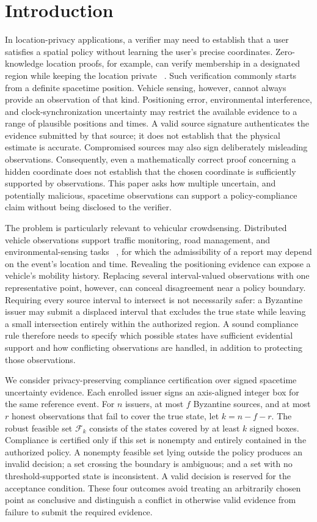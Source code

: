 \section{Introduction}
In location-privacy applications, a verifier may need to establish that a user satisfies a spatial policy without learning the user's precise coordinates. Zero-knowledge location proofs, for example, can verify membership in a designated region while keeping the location private ~\citep{ZKLP,VehiclePolicy}. Such verification commonly starts from a definite spacetime position. Vehicle sensing, however, cannot always provide an observation of that kind. Positioning error, environmental interference, and clock-synchronization uncertainty may restrict the available evidence to a range of plausible positions and times. A valid source signature authenticates the evidence submitted by that source; it does not establish that the physical estimate is accurate. Compromised sources may also sign deliberately misleading observations. Consequently, even a mathematically correct proof concerning a hidden coordinate does not establish that the chosen coordinate is sufficiently supported by observations. This paper asks how multiple uncertain, and potentially malicious, spacetime observations can support a policy-compliance claim without being disclosed to the verifier.

The problem is particularly relevant to vehicular crowdsensing. Distributed vehicle observations support traffic monitoring, road management, and environmental-sensing tasks ~\citep{Suhag2023,Zheng2025BARM}, for which the admissibility of a report may depend on the event's location and time. Revealing the positioning evidence can expose a vehicle's mobility history. Replacing several interval-valued observations with one representative point, however, can conceal disagreement near a policy boundary. Requiring every source interval to intersect is not necessarily safer: a Byzantine issuer may submit a displaced interval that excludes the true state while leaving a small intersection entirely within the authorized region. A sound compliance rule therefore needs to specify which possible states have sufficient evidential support and how conflicting observations are handled, in addition to protecting those observations.

We consider privacy-preserving compliance certification over signed spacetime uncertainty evidence. Each enrolled issuer signs an axis-aligned integer box for the same reference event. For $n$ issuers, at most $f$ Byzantine sources, and at most $r$ honest observations that fail to cover the true state, let $k = n - f - r$. The robust feasible set $\mathcal{F}_k$ consists of the states covered by at least $k$ signed boxes. Compliance is certified only if this set is nonempty and entirely contained in the authorized policy. A nonempty feasible set lying outside the policy produces an invalid decision; a set crossing the boundary is ambiguous; and a set with no threshold-supported state is inconsistent. A valid decision is reserved for the acceptance condition. These four outcomes avoid treating an arbitrarily chosen point as conclusive and distinguish a conflict in otherwise valid evidence from failure to submit the required evidence.

